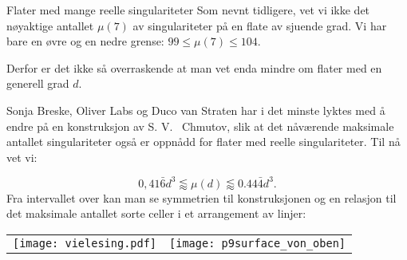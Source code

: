 \begin{surferPage}[216 singulariteter]{Flater med mange reelle singulariteter}
    Som nevnt tidligere, vet vi ikke det nøyaktige antallet 
    $\mu(7)$ av singulariteter på en flate av sjuende grad.
    Vi har bare en øvre og en nedre grense: $99\le \mu(7) \le 104$. 

	Derfor er det ikke så overraskende at man vet enda mindre om flater med en generell grad $d$.
	
	Sonja Breske, Oliver Labs og Duco van Straten har i det minste lyktes med å endre på en konstruksjon 
	av S. V. \ Chmutov, slik at det nåværende maksimale antallet
	singulariteter også er oppnådd for flater med reelle singulariteter. Til nå vet vi:
 
    \[0,41\bar{6}d^3 \lessapprox \mu(d) \lessapprox 0.44\bar{4} d^3.\]
Fra intervallet over kan man se symmetrien til konstruksjonen og en relasjon til det maksimale antallet sorte celler i et arrangement av linjer:
    \begin{center}
      \begin{tabular}{c@{\qquad}c}
        \texttt{[image: vielesing.pdf]}
        &
        \texttt{[image: p9surface\_von\_oben]}
      \end{tabular}
    \end{center}
\end{surferPage}
